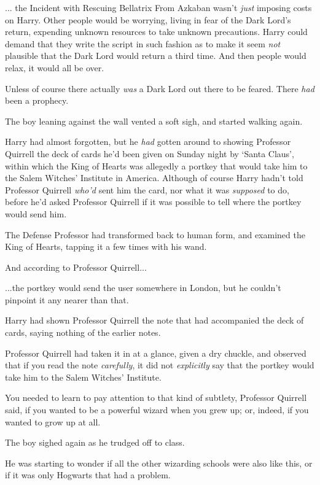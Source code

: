 ... the Incident with Rescuing Bellatrix From Azkaban wasn't
\emph{just} imposing costs on Harry. Other people would be worrying,
living in fear of the Dark Lord's return, expending unknown resources to
take unknown precautions. Harry could demand that they write the script
in such fashion as to make it seem \emph{not} plausible that the Dark
Lord would return a third time. And then people would relax, it would
all be over.

Unless of course there actually \emph{was} a Dark Lord out there to be
feared. There \emph{had} been a prophecy.

The boy leaning against the wall vented a soft sigh, and started walking
again.

Harry had almost forgotten, but he \emph{had} gotten around to showing
Professor Quirrell the deck of cards he'd been given on Sunday night by
`Santa Claus', within which the King of Hearts was allegedly a portkey
that would take him to the Salem Witches' Institute in America. Although
of course Harry hadn't told Professor Quirrell \emph{who'd} sent him the
card, nor what it was \emph{supposed} to do, before he'd asked Professor
Quirrell if it was possible to tell where the portkey would send him.

The Defense Professor had transformed back to human form, and examined
the King of Hearts, tapping it a few times with his wand.

And according to Professor Quirrell...

...the portkey would send the user somewhere in London, but he
couldn't pinpoint it any nearer than that.

Harry had shown Professor Quirrell the note that had accompanied the
deck of cards, saying nothing of the earlier notes.

Professor Quirrell had taken it in at a glance, given a dry chuckle, and
observed that if you read the note \emph{carefully}, it did not
\emph{explicitly} say that the portkey would take him to the Salem
Witches' Institute.

You needed to learn to pay attention to that kind of subtlety, Professor
Quirrell said, if you wanted to be a powerful wizard when you grew up;
or, indeed, if you wanted to grow up at all.

The boy sighed again as he trudged off to class.

He was starting to wonder if all the other wizarding schools were also
like this, or if it was only Hogwarts that had a problem.
